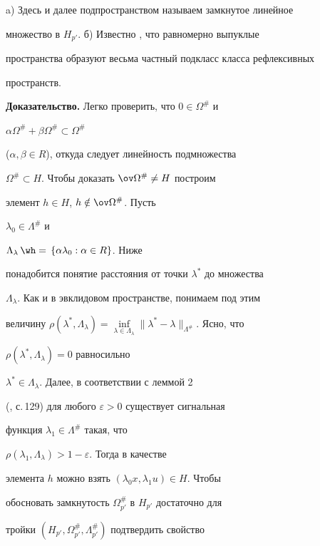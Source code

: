  


\begin{note} 


a) Здесь и далее подпространством называем замкнутое линейное 


множество в $H_{p'}$. б) Известно \cite{16}, что равномерно выпуклые 


пространства образуют весьма частный подкласс класса рефлексивных 


пространств. 


\end{note} 


 


{\bf Доказательство.} Легко проверить, что $0\in\Omega^{\#}$ и 


$\alpha\Omega^{\#}+\beta\Omega^{\#}\subset\Omega^{\#}$ 


($\alpha,\beta\in R$), откуда следует линейность подмножества 


$\Omega^{\#}\subset H$. Чтобы доказать $\ov\Omega^{\#}\ne H$ построим 


элемент $h\in H$, $h\notin\ov\Omega^{\#}$. Пусть 


$\lambda_0\in\Lambda^{\#}$ и 


$\Lambda_\lambda\hateq\{\alpha\lambda_0:\alpha\in R\}$. Ниже 


понадобится понятие расстояния от точки $\lambda^*$ до множества 


$\Lambda_\lambda$. Как и в эвклидовом пространстве, понимаем под этим 


величину $\rho(\lambda^*,\Lambda_\lambda)= 


\inf\limits_{\lambda\in\Lambda_\lambda}\|\lambda^*- 


\lambda\|_{\Lambda^{\#}}$. Ясно, что 


$\rho(\lambda^*,\Lambda_\lambda)=0$ равносильно 


$\lambda^*\in\Lambda_\lambda$. Далее, в соответствии с леммой 2 


(\cite{13}, с.\,129) для любого $\varepsilon>0$ существует сигнальная 


функция $\lambda_1\in\Lambda^{\#}$ такая, что 


$\rho(\lambda_1,\Lambda_\lambda)>1-\varepsilon$. Тогда в качестве 


элемента $h$ можно взять $(\lambda_0x,\lambda_1u)\in H$. Чтобы 


обосновать замкнутость $\Omega^{\#}_{p'}$ в $H_{p'}$ достаточно для 


тройки $(H_{p'},\Omega^{\#}_{p'},\Lambda^{\#}_{p'})$ подтвердить свойство 


